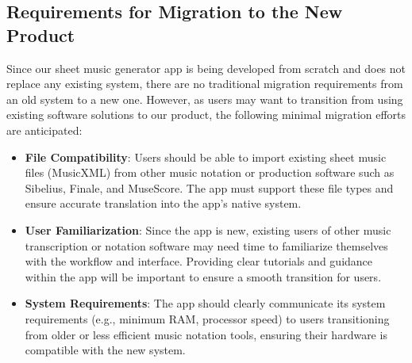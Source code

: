 \documentclass[12pt]{article}
\begin{document}
\subsection{Requirements for Migration to the New Product}
Since our sheet music generator app is being developed from scratch and does not replace any existing system, there are no traditional migration requirements from an old system to a new one. However, as users may want to transition from using existing software solutions to our product, the following minimal migration efforts are anticipated:
\begin{itemize}
    \item \textbf{File Compatibility}: Users should be able to import existing sheet music files (MusicXML) from other music notation or production software such as Sibelius, Finale, and MuseScore. The app must support these file types and ensure accurate translation into the app’s native system.
    
    \item \textbf{User Familiarization}: Since the app is new, existing users of other music transcription or notation software may need time to familiarize themselves with the workflow and interface. Providing clear tutorials and guidance within the app will be important to ensure a smooth transition for users.
    
    \item \textbf{System Requirements}: The app should clearly communicate its system requirements (e.g., minimum RAM, processor speed) to users transitioning from older or less efficient music notation tools, ensuring their hardware is compatible with the new system.
\end{itemize}
\end{document}
